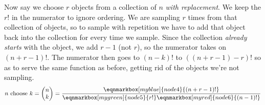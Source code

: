 \documentclass{report}
\begin{document}
 Now say we choose $ r $ objects from a collection 
of $ n $ \textit{with replacement}. We keep the $ r! $ in the numerator to 
ignore ordering. We are sampling $ r $ times from that collection of objects, 
so to sample with repetition we have to add that object back into the collection 
for every time we sample. Since the collection \textit{already starts} with 
the object, we add $ r-1 $ (not $ r $), so the numerator takes on $ (n+r-1)! $. 
The numerator then goes to $ (n - k)! $ to $ ((n+ r - 1) - r)! $ so as to 
serve the same function as before, getting rid of the objects we're not 
sampling. 
\vspace*{2em}
\begin{equation*}
n \text{ choose } k = 
\begin{pmatrix}
n \\ k 
\end{pmatrix}	
= 
\frac{\eqnmarkbox[myblue]{node4}{(n+r-1)!}}{\eqnmarkbox[mygreen]{node5}{r!} \eqnmarkbox[myred]{node6}{(n-1)!}}
\end{equation*}
\end{document}
